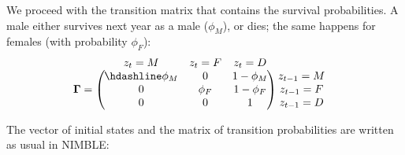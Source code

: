 \documentclass[
  12pt,
]{krantz}
\begin{document}
We proceed with the transition matrix that contains the survival probabilities. A male either survives next year as a male (\(\phi_M\)), or dies; the same happens for females (with probability \(\phi_F\)):
\[\begin{matrix}
& \\
\mathbf{\Gamma} =
  \left ( \vphantom{ \begin{matrix} 12 \\ 12 \\ 12 \end{matrix} } \right .
          \end{matrix}
          \hspace{-1.2em}
          \begin{matrix}
          z_t=M & z_t=F & z_t=D \\ \hdashline
          \phi_M  & 0 & 1 - \phi_M\\
          0 & \phi_F & 1 - \phi_F\\
          0 & 0 & 1
          \end{matrix}
          \hspace{-0.2em}
          \begin{matrix}
          & \\
          \left . \vphantom{ \begin{matrix} 12 \\ 12 \\ 12 \end{matrix} } \right )
\begin{matrix}
z_{t-1}=M \\ z_{t-1}=F \\ z_{t-1}=D
\end{matrix}
\end{matrix}\]

The vector of initial states and the matrix of transition probabilities are written as usual in NIMBLE:
\end{document}
